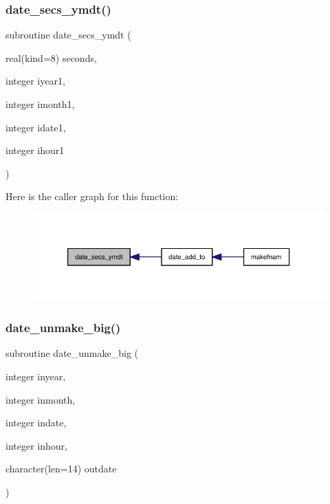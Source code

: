 \subsubsection{\texorpdfstring{date\+\_\+secs\+\_\+ymdt()}{date\_secs\_ymdt()}}
{\footnotesize\ttfamily subroutine date\+\_\+secs\+\_\+ymdt (\begin{DoxyParamCaption}\item[{real(kind=8)}]{seconds,  }\item[{integer}]{iyear1,  }\item[{integer}]{imonth1,  }\item[{integer}]{idate1,  }\item[{integer}]{ihour1 }\end{DoxyParamCaption})}

Here is the caller graph for this function\+:
\nopagebreak
\begin{figure}[H]
\begin{center}
\leavevmode
\includegraphics[width=333pt]{dateutils_8f90_abd0aaee09a0949cfef32003dae34f41d_icgraph}
\end{center}
\end{figure}
\mbox{\label{dateutils_8f90_a151300a087ebed5a3efb44a63988654c}} 
\subsubsection{\texorpdfstring{date\+\_\+unmake\+\_\+big()}{date\_unmake\_big()}}
{\footnotesize\ttfamily subroutine date\+\_\+unmake\+\_\+big (\begin{DoxyParamCaption}\item[{integer}]{inyear,  }\item[{integer}]{inmonth,  }\item[{integer}]{indate,  }\item[{integer}]{inhour,  }\item[{character(len=14)}]{outdate }\end{DoxyParamCaption})}

